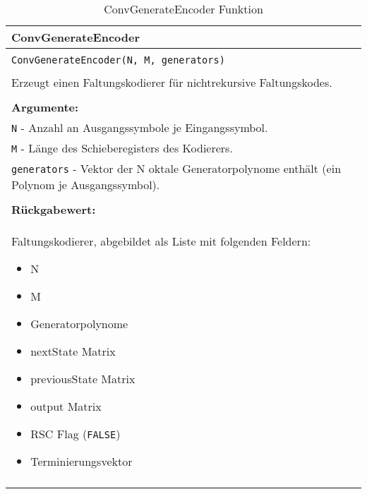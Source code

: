 \begin{longtable}{|p{\textwidth}|}
\hline
\rowcolor{lightblue}
ConvGenerateEncoder
\\
\hline
\\
\texttt{ConvGenerateEncoder(N, M, generators)}\\
\\
Erzeugt einen Faltungskodierer für nichtrekursive Faltungskodes.\\
\\
\textbf{Argumente:}\\
\texttt{N} - Anzahl an Ausgangssymbole je Eingangssymbol.\\
\texttt{M} - Länge des Schieberegisters des Kodierers.\\
\texttt{generators} - Vektor der N oktale Generatorpolynome enthält (ein Polynom je Ausgangssymbol).\\
\\
\textbf{Rückgabewert:}\\
Faltungskodierer, abgebildet als Liste mit folgenden Feldern:
\vspace{-4mm}
\begin{itemize}
\renewcommand\labelitemi{--}
\itemsep-.5em %
\item N
\item M
\item Generatorpolynome
\item nextState Matrix
\item previousState Matrix
\item output Matrix
\item RSC Flag (\texttt{FALSE})
\item Terminierungsvektor
\end{itemize}
\\
\hline
\caption{ConvGenerateEncoder Funktion}
\end{longtable}